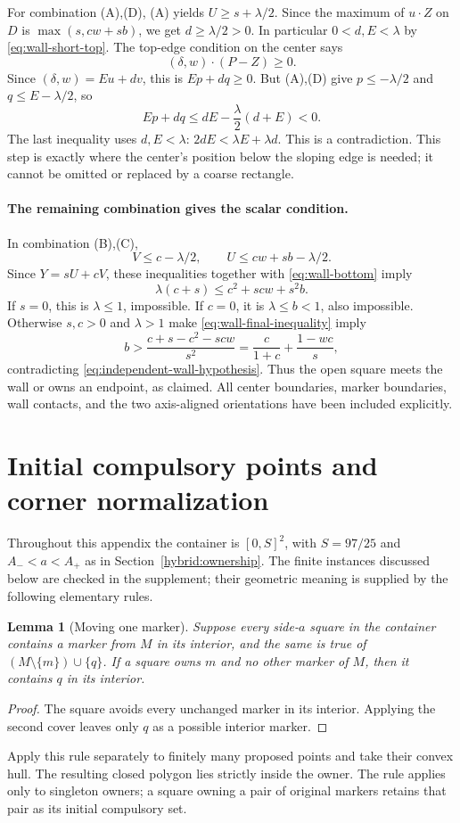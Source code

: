 \documentclass[11pt]{article}
\newtheorem{lemma}[theorem]{Lemma}
\begin{document}
For combination (A),(D), (A) yields $U\ge s+\lambda/2$.
Since the maximum of $u\cdot Z$ on $D$ is $\max(s,cw+sb)$,
we get $d\ge\lambda/2>0$. In particular $0<d,E<\lambda$ by
\eqref{eq:wall-short-top}. The top-edge condition on the center says
\[
 (\delta,w)\cdot(P-Z)\ge0.
\]
Since $(\delta,w)=E u+d v$, this is $Ep+dq\ge0$.
But (A),(D) give $p\le-\lambda/2$ and $q\le E-\lambda/2$, so
\[
 Ep+dq\le dE-\frac\lambda2(d+E)<0.
\]
The last inequality uses $d,E<\lambda$:
$2dE<\lambda E+\lambda d$. This is a contradiction.
This step is exactly where the center's position below the sloping edge
is needed; it cannot be omitted or replaced by a coarse rectangle.

\paragraph{The remaining combination gives the scalar condition.}
In combination (B),(C),
\[
 V\le c-\lambda/2,\qquad U\le cw+sb-\lambda/2.
\]
Since $Y=sU+cV$, these inequalities together with
\eqref{eq:wall-bottom} imply
\begin{equation}\label{eq:wall-final-inequality}
 \lambda(c+s)\le c^2+scw+s^2b.
\end{equation}
If $s=0$, this is $\lambda\le1$, impossible. If $c=0$, it is
$\lambda\le b<1$, also impossible. Otherwise $s,c>0$ and
$\lambda>1$ make \eqref{eq:wall-final-inequality} imply
\[
 b>\frac{c+s-c^2-scw}{s^2}
   =\frac{c}{1+c}+\frac{1-wc}{s},
\]
contradicting \eqref{eq:independent-wall-hypothesis}.
Thus the open square meets the wall or owns an endpoint, as claimed.
All center boundaries, marker boundaries, wall contacts, and the two
axis-aligned orientations have been included explicitly.



\section{Initial compulsory points and corner normalization}
\label{app:initial-corners}
Throughout this appendix the container is $[0,S]^2$, with
$S=97/25$ and $A_-<a<A_+$ as in Section~\ref{hybrid:ownership}.
The finite instances discussed below are checked in the supplement; their
geometric meaning is supplied by the following elementary rules.

\begin{lemma}[Moving one marker]\label{lem:moving-marker}
Suppose every side-$a$ square in the container contains a marker from
$M$ in its interior, and the same is true of
$(M\setminus\{m\})\cup\{q\}$. If a square owns $m$ and no other
marker of $M$, then it contains $q$ in its interior.
\end{lemma}
\begin{proof}
The square avoids every unchanged marker in its interior. Applying the
second cover leaves only $q$ as a possible interior marker.
\end{proof}
Apply this rule separately to finitely many proposed points and take their
convex hull. The resulting closed polygon lies strictly inside the owner.
The rule applies only to singleton owners; a square owning a pair of
original markers retains that pair as its initial compulsory set.
\end{document}
